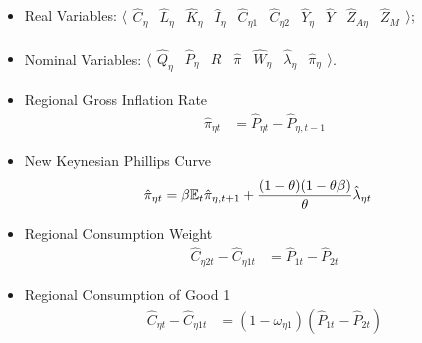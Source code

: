 \documentclass[../thesis.tex]{subfiles}
\begin{document}
{\singlespacing
	
	\renewcommand{\labelitemi}{--}
	
	\begin{itemize}
		
	\item Real Variables: $\langle \begin{matrix} \hat{C}_{\eta } & \hat{L}_{\eta } & \hat{K}_{\eta} & \hat{I}_{\eta} & \hat{C}_{\eta 1} & \hat{C}_{\eta 2} & \hat{Y}_{\eta } & \hat{Y}_{} & \hat{Z}_{A\eta } & \hat{Z}_{M} \end{matrix} \rangle$;
			
	\item Nominal Variables: $\langle \begin{matrix} \hat{Q}_{\eta} & \hat{P}_{\eta } & \hat{R}_{} & \hat{\pi}_{} & \hat{W}_{\eta } & \hat{\lambda}_{\eta } & \hat{\pi}_{\eta } \end{matrix} \rangle$.
			
	\end{itemize}
		
	\begin{itemize}
					
		\item Regional Gross Inflation Rate
		\begin{align}
				\hat{\pi}_{\eta t} &= \hat{P}_{\eta t} - \hat{P}_{\eta, t-1} \label{eq_v2:level-dev-regional-inflation}
			\end{align}
			
			\item New Keynesian Phillips Curve
			\begin{align}
				\hat{\pi}_{\eta t} &= \beta {\mathbb{E}_{t}} \hat{\pi}_{\eta, t+1} + \frac{(1-\theta) (1- \theta \beta)}{\theta} \hat{\lambda}_{\eta t} \label{eq_v2:reg-nk-phillips-curve-mc}
			\end{align}
			
			\item Regional Consumption Weight
			\begin{align}
				\hat{C}_{\eta 2t} - \hat{C}_{\eta 1t} &= \hat{P}_{1t} - \hat{P}_{2t} \label{eq_v2:reg-C-eta-12-t-ll}
			\end{align}
			
			\item Regional Consumption of Good 1
			\begin{align}
				\hat{C}_{\eta t} - \hat{C}_{\eta 1 t} &= (1 - \omega_{\eta 1}) (\hat{P}_{1t} - \hat{P}_{2t}) \label{eq_v2:reg-C-eta-1-t-ll}
			\end{align}
			

\end{itemize}}
\end{document}
